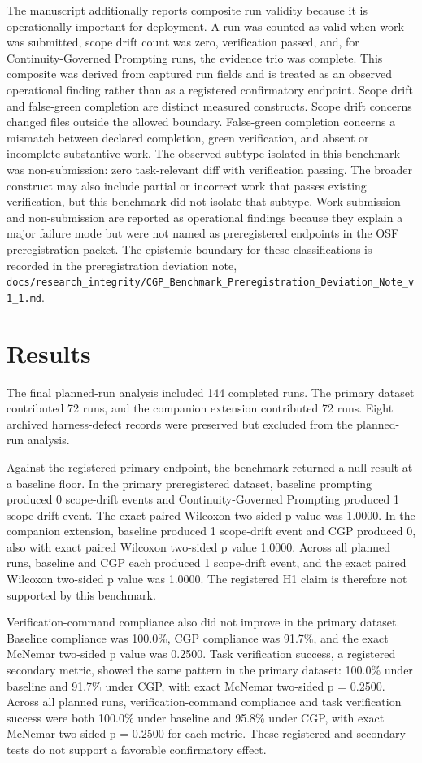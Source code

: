 \documentclass[11pt]{article}
\begin{document}
The manuscript additionally reports composite run validity because it is operationally important for deployment. A run was counted as valid when work was submitted, scope drift count was zero, verification passed, and, for Continuity-Governed Prompting runs, the evidence trio was complete. This composite was derived from captured run fields and is treated as an observed operational finding rather than as a registered confirmatory endpoint. Scope drift and false-green completion are distinct measured constructs. Scope drift concerns changed files outside the allowed boundary. False-green completion concerns a mismatch between declared completion, green verification, and absent or incomplete substantive work. The observed subtype isolated in this benchmark was non-submission: zero task-relevant diff with verification passing. The broader construct may also include partial or incorrect work that passes existing verification, but this benchmark did not isolate that subtype. Work submission and non-submission are reported as operational findings because they explain a major failure mode but were not named as preregistered endpoints in the OSF preregistration packet. The epistemic boundary for these classifications is recorded in the preregistration deviation note, \texttt{docs/research\_integrity/CGP\_Benchmark\_Preregistration\_Deviation\_Note\_v1\_1.md}.

\section{Results}
The final planned-run analysis included 144 completed runs. The primary dataset contributed 72 runs, and the companion extension contributed 72 runs. Eight archived harness-defect records were preserved but excluded from the planned-run analysis.

Against the registered primary endpoint, the benchmark returned a null result at a baseline floor. In the primary preregistered dataset, baseline prompting produced 0 scope-drift events and Continuity-Governed Prompting produced 1 scope-drift event. The exact paired Wilcoxon two-sided p value was 1.0000. In the companion extension, baseline produced 1 scope-drift event and CGP produced 0, also with exact paired Wilcoxon two-sided p value 1.0000. Across all planned runs, baseline and CGP each produced 1 scope-drift event, and the exact paired Wilcoxon two-sided p value was 1.0000. The registered H1 claim is therefore not supported by this benchmark.

Verification-command compliance also did not improve in the primary dataset. Baseline compliance was 100.0\%, CGP compliance was 91.7\%, and the exact McNemar two-sided p value was 0.2500. Task verification success, a registered secondary metric, showed the same pattern in the primary dataset: 100.0\% under baseline and 91.7\% under CGP, with exact McNemar two-sided p = 0.2500. Across all planned runs, verification-command compliance and task verification success were both 100.0\% under baseline and 95.8\% under CGP, with exact McNemar two-sided p = 0.2500 for each metric. These registered and secondary tests do not support a favorable confirmatory effect.
\end{document}
